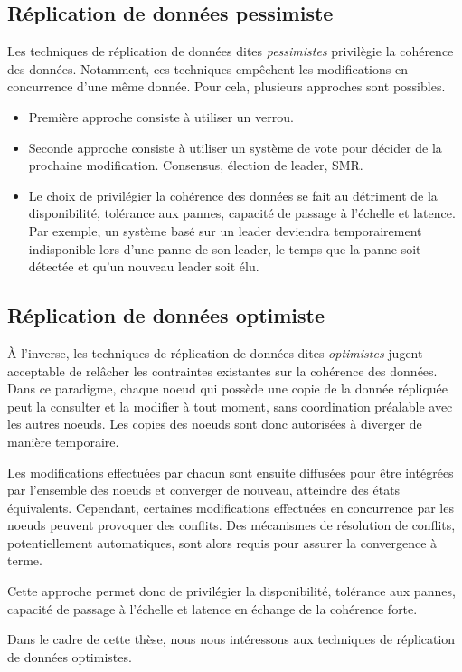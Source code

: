 \begin{definition}[Cohérence]
\end{definition}

\subsection{Réplication de données pessimiste}

Les techniques de réplication de données dites \emph{pessimistes} privilègie la cohérence des données.
Notamment, ces techniques empêchent les modifications en concurrence d'une même donnée.
Pour cela, plusieurs approches sont possibles.

\begin{itemize}
    \item Première approche consiste à utiliser un verrou.
    \item Seconde approche consiste à utiliser un système de vote pour décider de la prochaine modification.
        Consensus, élection de leader, SMR.
    \item Le choix de privilégier la cohérence des données se fait au détriment de la disponibilité, tolérance aux pannes, capacité de passage à l'échelle et latence.
        Par exemple, un système basé sur un leader deviendra temporairement indisponible lors d'une panne de son leader, le temps que la panne soit détectée et qu'un nouveau leader soit élu.
\end{itemize}

\subsection{Réplication de données optimiste}

À l'inverse, les techniques de réplication de données dites \emph{optimistes} jugent acceptable de relâcher les contraintes existantes sur la cohérence des données.
Dans ce paradigme, chaque noeud qui possède une copie de la donnée répliquée peut la consulter et la modifier à tout moment, sans coordination préalable avec les autres noeuds.
Les copies des noeuds sont donc autorisées à diverger de manière temporaire.

Les modifications effectuées par chacun sont ensuite diffusées pour être intégrées par l'ensemble des noeuds et converger de nouveau, \ie atteindre des états équivalents.
Cependant, certaines modifications effectuées en concurrence par les noeuds peuvent provoquer des conflits.
Des mécanismes de résolution de conflits, potentiellement automatiques, sont alors requis pour assurer la convergence à terme.

Cette approche permet donc de privilégier la disponibilité, tolérance aux pannes, capacité de passage à l'échelle et latence en échange de la cohérence forte.

Dans le cadre de cette thèse, nous nous intéressons aux techniques de réplication de données optimistes.
